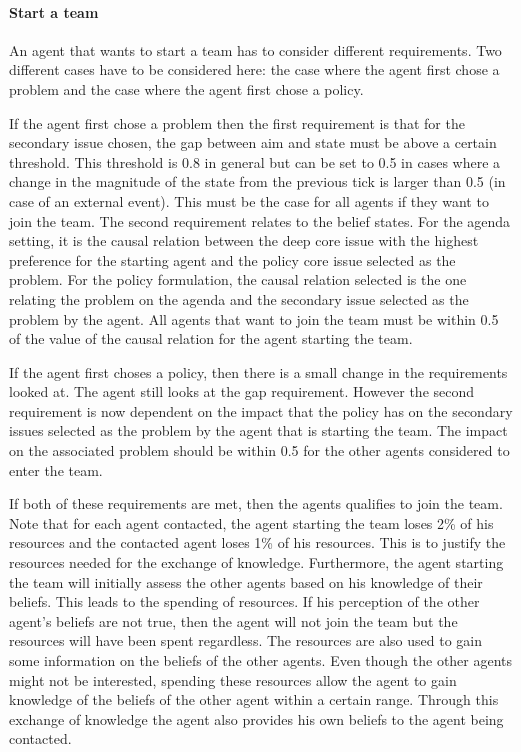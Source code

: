 \paragraph{Start a team}

An agent that wants to start a team has to consider different requirements. Two different cases have to be considered here: the case where the agent first chose a problem and the case where the agent first chose a policy.

If the agent first chose a problem then the first requirement is that for the secondary issue chosen, the gap between aim and state must be above a certain threshold. This threshold is 0.8 in general but can be set to 0.5 in cases where a change in the magnitude of the state from the previous tick is larger than 0.5 (in case of an external event). This must be the case for all agents if they want to join the team. The second requirement relates to the belief states. For the agenda setting, it is the causal relation between the deep core issue with the highest preference for the starting agent and the policy core issue selected as the problem. For the policy formulation, the causal relation selected is the one relating the problem on the agenda and the secondary issue selected as the problem by the agent. All agents that want to join the team must be within 0.5 of the value of the causal relation for the agent starting the team.

If the agent first choses a policy, then there is a small change in the requirements looked at. The agent still looks at the gap requirement. However the second requirement is now dependent on the impact that the policy has on the secondary issues selected as the problem by the agent that is starting the team. The impact on the associated problem should be within 0.5 for the other agents considered to enter the team.

If both of these requirements are met, then the agents qualifies to join the team. Note that for each agent contacted, the agent starting the team loses 2\% of his resources and the contacted agent loses 1\% of his resources. This is to justify the resources needed for the exchange of knowledge. Furthermore, the agent starting the team will initially assess the other agents based on his knowledge of their beliefs. This leads to the spending of resources. If his perception of the other agent's beliefs are not true, then the agent will not join the team but the resources will have been spent regardless. The resources are also used to gain some information on the beliefs of the other agents. Even though the other agents might not be interested, spending these resources allow the agent to gain knowledge of the beliefs of the other agent within a certain range. Through this exchange of knowledge the agent also provides his own beliefs to the agent being contacted.

